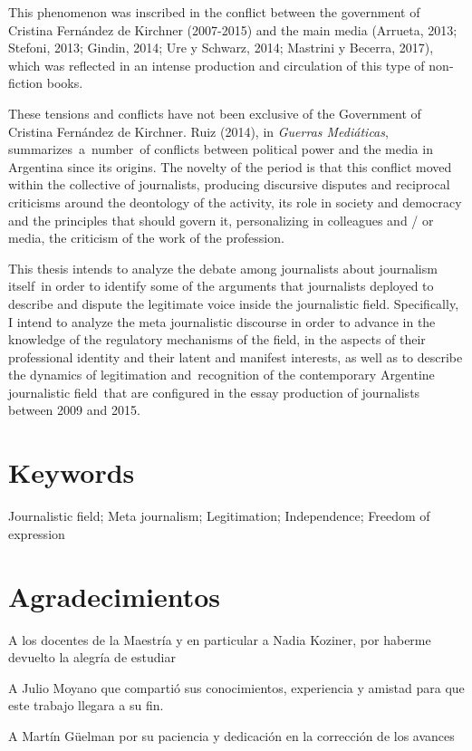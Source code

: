 This phenomenon was inscribed in the conflict between the government of Cristina Fernández de Kirchner (2007-2015) and the main media (Arrueta, 2013; Stefoni, 2013; Gindin, 2014; Ure y Schwarz, 2014; Mastrini y Becerra, 2017), which was reflected in an intense production and circulation of this type of non-fiction books.

These tensions and conflicts have not been exclusive of the Government of Cristina Fernández de Kirchner. Ruiz (2014), in \emph{Guerras Mediáticas}, summarizes~a~number~of conflicts between political power and the media in Argentina since its origins. The novelty of the period is that this conflict moved within the collective of journalists, producing discursive disputes and reciprocal criticisms around the deontology of the activity, its role in society and democracy and the principles that should govern it, personalizing in colleagues and / or media, the criticism of the work of the profession.

This thesis intends to analyze the debate among journalists about journalism itself~in order to identify some of the arguments that journalists deployed to describe and dispute the legitimate voice inside the journalistic field. Specifically, I intend to analyze the meta journalistic discourse in order to advance in the knowledge of the regulatory mechanisms of the field, in the aspects of their professional identity and their latent and manifest interests, as well as to describe the dynamics of legitimation and~recognition of the contemporary Argentine journalistic field~that are configured in the essay production of journalists between 2009 and 2015.

\chapter{Keywords}

Journalistic field; Meta journalism; Legitimation; Independence; Freedom of expression


\chapter{Agradecimientos}

A los docentes de la Maestría y en particular a Nadia Koziner, por haberme devuelto la alegría de estudiar

A Julio Moyano que compartió sus conocimientos, experiencia y amistad para que este trabajo llegara a su fin.

A Martín Güelman por su paciencia y dedicación en la corrección de los avances

